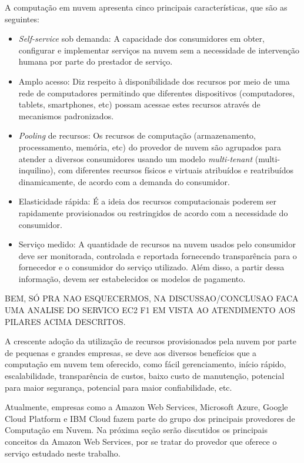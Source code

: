 A computação em nuvem apresenta cinco principais características, que são as seguintes:
\begin{itemize}
    \item \textit{Self-service} sob demanda: A capacidade dos consumidores em obter, configurar e implementar serviços na nuvem sem a necessidade de intervenção humana por parte do prestador de serviço.
    
    \item Amplo acesso: Diz respeito à disponibilidade dos recursos por meio de uma rede de computadores permitindo que diferentes dispositivos (computadores, tablets, smartphones, etc) possam acessae estes recursos através de mecanismos padronizados.   
    
    \item \textit{Pooling} de recursos: Os recursos de computação (armazenamento, processamento, memória, etc) do provedor de nuvem são agrupados para atender a diversos consumidores usando um modelo \textit{multi-tenant} (multi-inquilino), com diferentes recursos físicos e virtuais atribuídos e reatribuídos dinamicamente, de acordo com a demanda do consumidor.
    
    \item Elasticidade rápida: É a ideia dos recursos computacionais poderem ser rapidamente provisionados ou restringidos de acordo com a necessidade do consumidor.
    
    \item Serviço medido: A quantidade de recursos na nuvem usados pelo consumidor deve ser monitorada, controlada e reportada fornecendo transparência para o fornecedor e o consumidor do serviço utilizado.  Além disso, a partir dessa informação, devem ser estabelecidos os modelos de pagamento.

\end{itemize}

BEM, SÓ PRA NAO ESQUECERMOS, NA DISCUSSAO/CONCLUSAO FACA UMA ANALISE DO SERVICO EC2 F1 EM VISTA AO ATENDIMENTO AOS PILARES ACIMA DESCRITOS.

A crescente adoção da utilização de recursos provisionados pela nuvem por parte de pequenas e grandes empresas, se deve aos diversos benefícios que a computação em nuvem tem oferecido, como fácil gerenciamento, início rápido, escalabilidade, transparência de custos, baixo custo de manutenção, potencial para maior segurança, potencial para maior confiabilidade, etc. \cite{5942089}

Atualmente, empresas como a Amazon Web Services, Microsoft Azure, Google Cloud Platform e IBM Cloud fazem parte do grupo dos principais provedores de Computação em Nuvem. Na próxima seção serão discutidos os principais conceitos da Amazon Web Services, por se tratar do provedor que oferece o serviço estudado neste trabalho.  

